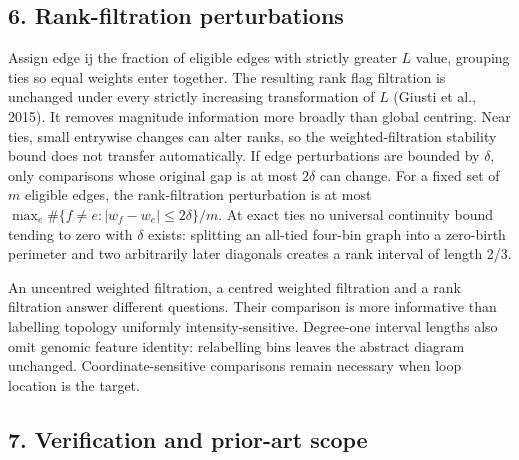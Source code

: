 \documentclass[
  11pt,
]{article}
\begin{document}
\subsection{6. Rank-filtration
perturbations}\label{rank-filtration-perturbations}

Assign edge ij the fraction of eligible edges with strictly greater
\(L\) value, grouping ties so equal weights enter together. The
resulting rank flag filtration is unchanged under every strictly
increasing transformation of \(L\) (Giusti et al., 2015). It removes
magnitude information more broadly than global centring. Near ties,
small entrywise changes can alter ranks, so the weighted-filtration
stability bound does not transfer automatically. If edge perturbations
are bounded by \(\delta\), only comparisons whose original gap is at
most \(2\delta\) can change. For a fixed set of \(m\) eligible edges,
the rank-filtration perturbation is at most
\(\max_e \#\{f\ne e:|w_f-w_e|\leq2\delta\}/m\). At exact ties no
universal continuity bound tending to zero with \(\delta\) exists:
splitting an all-tied four-bin graph into a zero-birth perimeter and two
arbitrarily later diagonals creates a rank interval of length 2/3.

An uncentred weighted filtration, a centred weighted filtration and a
rank filtration answer different questions. Their comparison is more
informative than labelling topology uniformly intensity-sensitive.
Degree-one interval lengths also omit genomic feature identity:
relabelling bins leaves the abstract diagram unchanged.
Coordinate-sensitive comparisons remain necessary when loop location is
the target.

\subsection{7. Verification and prior-art
scope}\label{verification-and-prior-art-scope}
\end{document}
